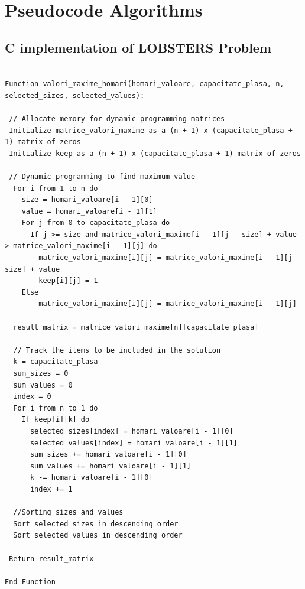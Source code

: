 \documentclass{article}%
\begin{document}
      \vspace*{\fill}                  
      \section{Pseudocode Algorithms}
      \vspace{1cm}
\subsection{C implementation of LOBSTERS Problem}
\begin{verbatim}
                        
Function valori_maxime_homari(homari_valoare, capacitate_plasa, n, selected_sizes, selected_values):
                        
 // Allocate memory for dynamic programming matrices              
 Initialize matrice_valori_maxime as a (n + 1) x (capacitate_plasa + 1) matrix of zeros
 Initialize keep as a (n + 1) x (capacitate_plasa + 1) matrix of zeros
            
 // Dynamic programming to find maximum value              
  For i from 1 to n do
    size = homari_valoare[i - 1][0]
    value = homari_valoare[i - 1][1]
    For j from 0 to capacitate_plasa do
      If j >= size and matrice_valori_maxime[i - 1][j - size] + value > matrice_valori_maxime[i - 1][j] do
        matrice_valori_maxime[i][j] = matrice_valori_maxime[i - 1][j - size] + value
        keep[i][j] = 1
    Else
        matrice_valori_maxime[i][j] = matrice_valori_maxime[i - 1][j]

  result_matrix = matrice_valori_maxime[n][capacitate_plasa]
               
  // Track the items to be included in the solution           
  k = capacitate_plasa
  sum_sizes = 0
  sum_values = 0
  index = 0
  For i from n to 1 do
    If keep[i][k] do
      selected_sizes[index] = homari_valoare[i - 1][0]
      selected_values[index] = homari_valoare[i - 1][1]
      sum_sizes += homari_valoare[i - 1][0]
      sum_values += homari_valoare[i - 1][1]
      k -= homari_valoare[i - 1][0]
      index += 1

  //Sorting sizes and values                                        
  Sort selected_sizes in descending order
  Sort selected_values in descending order

 Return result_matrix
                                            
End Function
                        
\end{verbatim}   
    \vspace*{\fill}                                        
\newpage%
\end{document}

